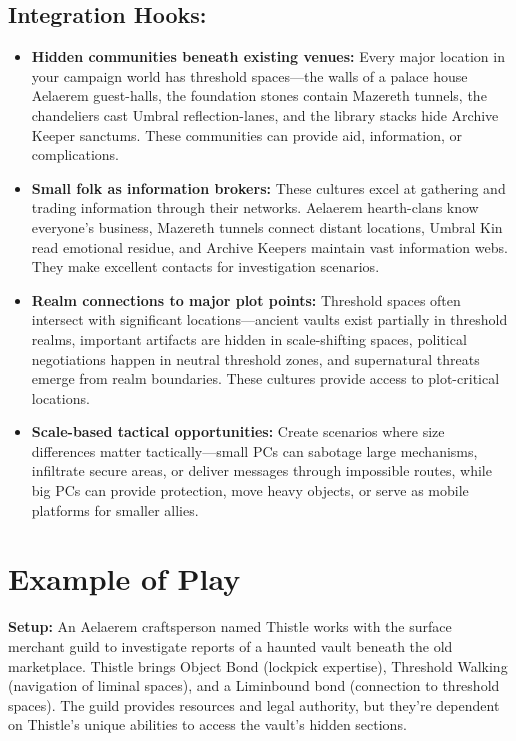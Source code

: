 \documentclass[11pt,letterpaper]{article}
\begin{document}
\subsection*{Integration Hooks:}
\begin{itemize}[leftmargin=*]
\item \textbf{Hidden communities beneath existing venues:} Every major location in your campaign world has threshold spaces---the walls of a palace house Aelaerem guest-halls, the foundation stones contain Mazereth tunnels, the chandeliers cast Umbral reflection-lanes, and the library stacks hide Archive Keeper sanctums. These communities can provide aid, information, or complications.
\item \textbf{Small folk as information brokers:} These cultures excel at gathering and trading information through their networks. Aelaerem hearth-clans know everyone's business, Mazereth tunnels connect distant locations, Umbral Kin read emotional residue, and Archive Keepers maintain vast information webs. They make excellent contacts for investigation scenarios.
\item \textbf{Realm connections to major plot points:} Threshold spaces often intersect with significant locations---ancient vaults exist partially in threshold realms, important artifacts are hidden in scale-shifting spaces, political negotiations happen in neutral threshold zones, and supernatural threats emerge from realm boundaries. These cultures provide access to plot-critical locations.
\item \textbf{Scale-based tactical opportunities:} Create scenarios where size differences matter tactically---small PCs can sabotage large mechanisms, infiltrate secure areas, or deliver messages through impossible routes, while big PCs can provide protection, move heavy objects, or serve as mobile platforms for smaller allies.
\end{itemize}

\section{Example of Play}

\textbf{Setup:} An Aelaerem craftsperson named Thistle works with the surface merchant guild to investigate reports of a haunted vault beneath the old marketplace. Thistle brings Object Bond (lockpick expertise), Threshold Walking (navigation of liminal spaces), and a Liminbound bond (connection to threshold spaces). The guild provides resources and legal authority, but they're dependent on Thistle's unique abilities to access the vault's hidden sections.
\end{document}
